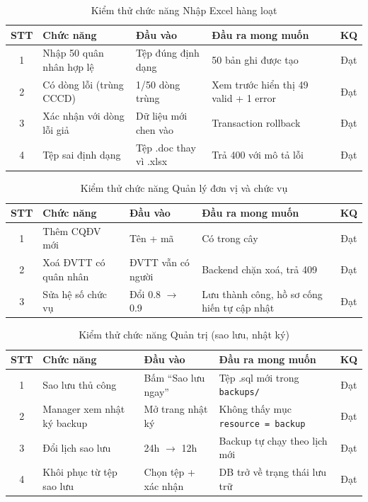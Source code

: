 \documentclass[../DoAn.tex]{subfiles}
\begin{document}
\begin{table}[H]
\centering
\caption{Kiểm thử chức năng Nhập Excel hàng loạt}
\label{tab:kt-excel}
\begin{tabular}{|c|p{4cm}|p{3.5cm}|p{4cm}|c|}
\hline
\textbf{STT} & \textbf{Chức năng} & \textbf{Đầu vào} & \textbf{Đầu ra mong muốn} & \textbf{KQ} \\ \hline
1 & Nhập 50 quân nhân hợp lệ & Tệp đúng định dạng & 50 bản ghi được tạo & Đạt \\ \hline
2 & Có dòng lỗi (trùng CCCD) & 1/50 dòng trùng & Xem trước hiển thị 49 valid + 1 error & Đạt \\ \hline
3 & Xác nhận với dòng lỗi giả & Dữ liệu mới chen vào & Transaction rollback & Đạt \\ \hline
4 & Tệp sai định dạng & Tệp .doc thay vì .xlsx & Trả 400 với mô tả lỗi & Đạt \\ \hline
\end{tabular}
\end{table}

\begin{table}[H]
\centering
\caption{Kiểm thử chức năng Quản lý đơn vị và chức vụ}
\label{tab:kt-donvi}
\begin{tabular}{|c|p{4cm}|p{3.5cm}|p{4cm}|c|}
\hline
\textbf{STT} & \textbf{Chức năng} & \textbf{Đầu vào} & \textbf{Đầu ra mong muốn} & \textbf{KQ} \\ \hline
1 & Thêm CQĐV mới & Tên + mã & Có trong cây & Đạt \\ \hline
2 & Xoá ĐVTT có quân nhân & ĐVTT vẫn có người & Backend chặn xoá, trả 409 & Đạt \\ \hline
3 & Sửa hệ số chức vụ & Đổi 0.8 $\rightarrow$ 0.9 & Lưu thành công, hồ sơ cống hiến tự cập nhật & Đạt \\ \hline
\end{tabular}
\end{table}

\begin{table}[H]
\centering
\caption{Kiểm thử chức năng Quản trị (sao lưu, nhật ký)}
\label{tab:kt-quantri}
\begin{tabular}{|c|p{4cm}|p{3.5cm}|p{4cm}|c|}
\hline
\textbf{STT} & \textbf{Chức năng} & \textbf{Đầu vào} & \textbf{Đầu ra mong muốn} & \textbf{KQ} \\ \hline
1 & Sao lưu thủ công & Bấm ``Sao lưu ngay'' & Tệp .sql mới trong \texttt{backups/} & Đạt \\ \hline
2 & Manager xem nhật ký backup & Mở trang nhật ký & Không thấy mục \texttt{resource = backup} & Đạt \\ \hline
3 & Đổi lịch sao lưu & 24h $\rightarrow$ 12h & Backup tự chạy theo lịch mới & Đạt \\ \hline
4 & Khôi phục từ tệp sao lưu & Chọn tệp + xác nhận & DB trở về trạng thái lưu trữ & Đạt \\ \hline
\end{tabular}
\end{table}
\end{document}
